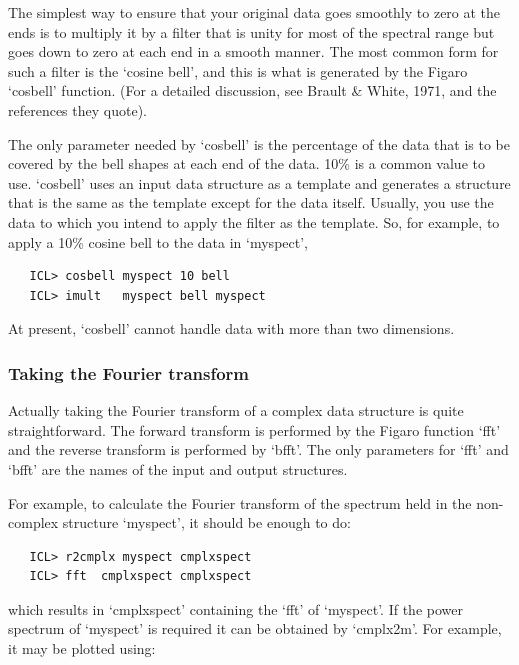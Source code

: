 \documentclass[11pt,twoside]{article}
\begin{document}
   The simplest way to ensure that your original data goes smoothly
   to zero at the ends is to multiply it by a filter that is unity for
   most of the spectral range but goes down to zero at each end in a
   smooth manner.  The most common form for such a filter is the `cosine
   bell', and this is what is generated by the Figaro `cosbell'
   function.  (For a detailed discussion, see Brault \& White, 1971,
   and the references they quote).

   The only parameter needed by `cosbell' is the percentage of the data
   that is to be covered by the bell shapes at each end of the data.
   10\% is a common value to use.  `cosbell' uses an input data structure
   as a template and generates a structure that is the same as the
   template except for the data itself.  Usually, you use the data to
   which you intend to apply the filter as the template.  So, for
   example, to apply a 10\% cosine bell to the data in `myspect',

\begin{verbatim}
   ICL> cosbell myspect 10 bell
   ICL> imult   myspect bell myspect
\end{verbatim}

   At present, `cosbell' cannot handle data with more than two dimensions.


\subsubsection{\label{techno6dofft}Taking the Fourier transform}

   Actually taking the Fourier transform of a complex data structure is
   quite straightforward.  The forward transform is performed by the
   Figaro function `fft' and the reverse transform is performed by
   `bfft'.  The only parameters for `fft' and `bfft' are the names of
   the input and output structures.

   For example, to calculate the Fourier transform of the spectrum
   held in the non-complex structure `myspect', it should be enough to
   do:

\begin{verbatim}
   ICL> r2cmplx myspect cmplxspect
   ICL> fft  cmplxspect cmplxspect
\end{verbatim}

   which results in `cmplxspect' containing the `fft' of `myspect'.  If the
   power spectrum of `myspect' is required it can be obtained by
   `cmplx2m'. For example, it may be plotted using:
\end{document}
